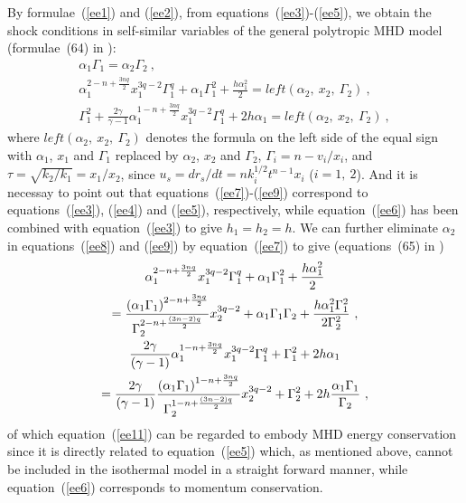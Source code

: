 \documentclass[fleqn,usenatbib]{mnras}
\begin{document}
By formulae~(\ref{ee1}) and (\ref{ee2}), from equations~(\ref{ee3})-(\ref{ee5}), we obtain the shock conditions in self-similar variables of the general polytropic MHD model (formulae~(64) in \citet{wang2008dynamic}):
\begin{gather}
\alpha_{1}\Gamma_{1}=\alpha_{2}\Gamma_{2}\ ,\label{ee7}\\
\alpha_{1}^{2-n+\frac{3nq}{2}}x_{1}^{3q-2}\Gamma_{1}^{q}+\alpha_{1}\Gamma_{1}^{2}+\frac{h\alpha_{1}^{2}}{2}=left(\alpha_{2},\ x_{2},\ \Gamma_{2})\ ,\label{ee8}\\
\Gamma_{1}^{2}+\frac{2\gamma}{\gamma-1}\alpha_{1}^{1-n+\frac{3nq}{2}}x_{1}^{3q-2}\Gamma_{1}^{q}+2h\alpha_{1}=left(\alpha_{2},\ x_{2},\ \Gamma_{2})\ ,\label{ee9}
\end{gather}
where $left(\alpha_{2},\ x_{2},\ \Gamma_{2})$ denotes the formula on the left side of the equal sign with $\alpha_{1}$, $x_{1}$ and $\Gamma_{1}$ replaced by $\alpha_{2}$, $x_{2}$ and $\Gamma_{2}$, $\Gamma_{i}=n-v_{i}/x_{i}$, and $\tau=\sqrt{k_{2}/k_{1}}=x_{1}/x_{2}$, since $u_{s}=dr_{s}/dt=nk_{i}^{1/2}t^{n-1}x_{i}$ ($i=1,\ 2$). And it is necessay to point out that equations~(\ref{ee7})-(\ref{ee9}) correspond to equations~(\ref{ee3}), (\ref{ee4}) and (\ref{ee5}), respectively, while equation~(\ref{ee6}) has been combined with equation~(\ref{ee3}) to give $h_{1}=h_{2}=h$. We can further eliminate $\alpha_{2}$ in equations~(\ref{ee8}) and (\ref{ee9}) by equation~(\ref{ee7}) to give (equations~(65) in \citet{wang2008dynamic})
\begin{gather}
\alpha_{1}^{2-n+\frac{3nq}{2}}x_{1}^{3q-2}\Gamma_{1}^{q}+\alpha_{1}\Gamma_{1}^{2}+\frac{h\alpha_{1}^{2}}{2}\notag\\
=\frac{\left(\alpha_{1}\Gamma_{1}\right)^{2-n+\frac{3nq}{2}}}{\Gamma_{2}^{2-n+\frac{(3n-2)q}{2}}}x_{2}^{3q-2}+\alpha_{1}\Gamma_{1}\Gamma_{2}+\frac{h\alpha_{1}^{2}\Gamma_{1}^{2}}{2\Gamma_{2}^{2}}\ ,\label{ee10}\\
\frac{2\gamma}{(\gamma-1)}\alpha_{1}^{1-n+\frac{3nq}{2}}x_{1}^{3q-2}\Gamma_{1}^{q}+\Gamma_{1}^{2}+2h\alpha_{1}\notag\\
=\frac{2\gamma}{(\gamma-1)}\frac{\left(\alpha_{1}\Gamma_{1}\right)^{1-n+\frac{3nq}{2}}}{\Gamma_{2}^{1-n+\frac{(3n-2)q}{2}}}x_{2}^{3q-2}+\Gamma_{2}^{2}+2h\frac{\alpha_{1}\Gamma_{1}}{\Gamma_{2}}\ ,\label{ee11}
\end{gather}
of which equation~(\ref{ee11}) can be regarded to embody MHD energy conservation since it is directly related to equation~(\ref{ee5}) which, as mentioned above, cannot be included in the isothermal model in a straight forward manner, while equation~(\ref{ee6}) corresponds to momentum conservation.
\end{document}
